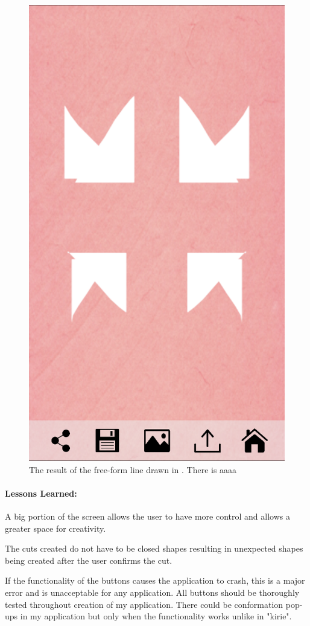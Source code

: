 \documentclass[11pt]{article}
\begin{document}
\begin{figure}[!ht]
\begin{minipage}{0.45\textwidth}
                            \includegraphics[width=0.7\linewidth]{Images/kirieCut.png}
                            \caption{The result of the free-form line drawn in . There is aaaa}
                            \label{fig:kirieCut}
                        \end{minipage}
                    \end{figure}
                
                \paragraph{Lessons Learned:}   
                A big portion of the screen allows the user to have more control and allows a greater space for creativity.
                
                The cuts created do not have to be closed shapes resulting in unexpected shapes being created after the user confirms the cut. 
               
                If the functionality of the buttons causes the application to crash, this is a major error and is unacceptable for any application. All buttons should be thoroughly tested throughout creation of my application. There could be conformation pop-ups in my application but only when the functionality works unlike in "kirie". 
                
\end{document}
